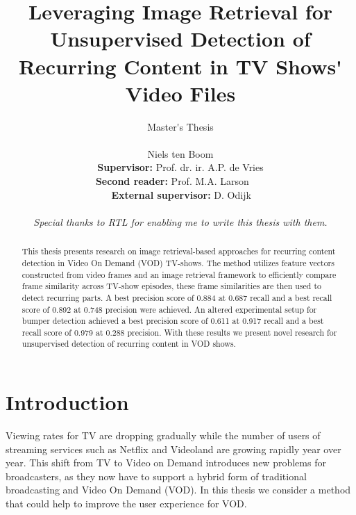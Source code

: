 \documentclass{report}
\begin{document}
\title{Leveraging Image Retrieval for Unsupervised Detection of Recurring Content in TV Shows\'{} Video Files}
\author{Master\'{}s Thesis\\ \\ Niels ten Boom \\ [1cm]{\small \textbf{Supervisor:} Prof. dr. ir. A.P. de Vries} \\ {\small \textbf{Second reader:} Prof. M.A. Larson \,\,\,\,\,\,\,\,} \\ {\small \textbf{\,External supervisor:} D. Odijk} \\ \\ \small{\textit{Special thanks to RTL for enabling me to write this thesis with them.}}}

\date{\vspace{-3ex}}

\maketitle
\newpage

\begin{abstract}
This thesis presents research on image retrieval-based approaches for recurring content detection in Video On Demand (VOD) TV-shows. The method utilizes feature vectors constructed from video frames and an image retrieval framework to efficiently compare frame similarity across TV-show episodes, these frame similarities are then used to detect recurring parts. A best precision score of 0.884 at 0.687 recall and a best recall score of 0.892 at 0.748 precision were achieved. An altered experimental setup for bumper detection achieved a best precision score of 0.611 at 0.917 recall and a best recall score of 0.979 at 0.288 precision. With these results we present novel research for unsupervised detection of recurring content in VOD shows.
\end{abstract}
\newpage

\tableofcontents
\newpage

\chapter{Introduction} \label{introduction}
Viewing rates for TV are dropping gradually while the number of users of streaming services such as Netflix and Videoland are growing rapidly year over year. This shift from TV to Video on Demand introduces new problems for broadcasters, as they now have to support a hybrid form of traditional broadcasting and Video On Demand (VOD). In this thesis we consider a method that could help to improve the user experience for VOD.
\end{document}

